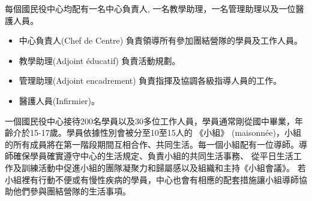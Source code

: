 \documentclass[a4paper,14pt]{extarticle}
\theoremstyle{plain}
\theoremstyle{remark}
\numberwithin{equation}{section}
\begin{document}
每個國民役中心均配有一名中心負責人, 一名教學助理，一名管理助理以及一位醫護人員。
\begin{itemize}
	\item 中心負責人(Chef de Centre) 負責領導所有參加團結營隊的學員及工作人員。
	\item 教學助理(Adjoint éducatif) 負責活動規劃。
	\item 管理助理(Adjoint encadrement) 負責指揮及協調各級指導人員的工作。
	\item 醫護人員(Infirmier)。
\end{itemize}

\par 

一個國民役中心接待200名學員以及30多位工作人員，學員通常剛從國中畢業，年齡介於15-17歲。學員依據性別會被分至10至15人的 《小組》 (maisonnée)，小組的所有成員將在第一階段期間互相合作、共同生活。每一個小組配有一位導師。導師確保學員確實遵守中心的生活規定、負責小組的共同生活事務、
從平日生活工作及訓練活動中促進小組的團隊凝聚力和歸屬感以及組織和主持《小組會議》。
若小組裡有行動不便或有慢性疾病的學員，中心也會有相應的配套措施讓小組導師協助他們參與團結營隊的生活事項。
%
%
%
\end{document}
